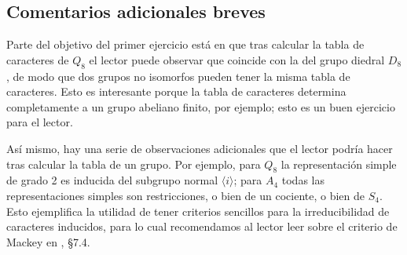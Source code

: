 \documentclass[11pt, reqno]{amsart}
\begin{document}
\begin{additional}
\appendix
\section{Comentarios adicionales breves}
Parte del objetivo del primer ejercicio está en que tras calcular la tabla de caracteres de $Q_8$ el lector puede observar que coincide con
la del grupo diedral $D_8$, de modo que dos grupos no isomorfos pueden tener la misma tabla de caracteres.
Esto es interesante porque la tabla de caracteres determina completamente a un grupo abeliano finito, por ejemplo; esto es un buen ejercicio
para el lector.

Así mismo, hay una serie de observaciones adicionales que el lector podría hacer tras calcular la tabla de un grupo.
Por ejemplo, para $Q_8$ la representación simple de grado 2 es inducida del subgrupo normal $\langle i \rangle$;
para $A_4$ todas las representaciones simples son restricciones, o bien de un cociente, o bien de $S_4$.
Esto ejemplifica la utilidad de tener criterios sencillos para la irreducibilidad de caracteres inducidos, para lo cual recomendamos al
lector leer sobre el criterio de Mackey en \cite{serre:representations}, \S 7.4.

\printbibliography
\end{additional}
\end{document}

